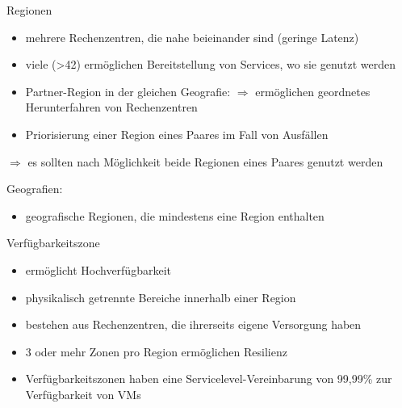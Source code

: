 
\begin{flashcard}[Definition]{Regionen}
    \begin{itemize}
        \item mehrere Rechenzentren, die nahe beieinander sind (geringe Latenz)
        \item viele (>42) ermöglichen Bereitstellung von Services, wo sie genutzt werden
        \item Partner-Region in der gleichen Geografie:\newline
        $\Rightarrow$ ermöglichen geordnetes Herunterfahren von Rechenzentren
        \item Priorisierung einer Region eines Paares im Fall von Ausfällen
    \end{itemize}
    $\Rightarrow$ es sollten nach Möglichkeit beide Regionen eines Paares genutzt werden

    \vspace{5mm}
    Geografien:
    \begin{itemize}
        \item geografische Regionen, die mindestens eine Region enthalten
    \end{itemize}

\end{flashcard}

\begin{flashcard}[Definition]{Verfügbarkeitszone}
    \begin{itemize}
        \item ermöglicht Hochverfügbarkeit
        \item physikalisch getrennte Bereiche innerhalb einer Region
        \item bestehen aus Rechenzentren, die ihrerseits eigene Versorgung haben
        \item 3 oder mehr Zonen pro Region ermöglichen Resilienz
        \item Verfügbarkeitszonen haben eine Servicelevel-Vereinbarung von 99,99\% zur Verfügbarkeit von VMs
    \end{itemize}
\end{flashcard}

